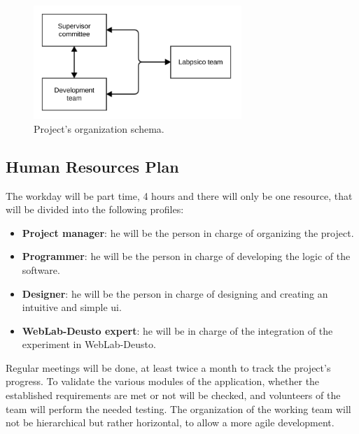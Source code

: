 \begin{figure}[ht]
	\centering
	\includegraphics[width=0.7\textwidth]{fig/organization}
	\caption{Project's organization schema.}\label{fig:org}
\end{figure}

\subsection{Human Resources Plan}

The workday will be part time, 4 hours and there will only be one resource, that will be divided
into the following profiles:

\begin{itemize}
\item \textbf{Project manager}: he will be the person in charge of organizing the project.

\item \textbf{Programmer}: he will be the person in charge of developing the logic of the
software.

\item \textbf{Designer}: he will be the person in charge of designing and creating an intuitive and
simple \acrlong{ui}.

\item \textbf{WebLab-Deusto expert}: he will be in charge of the integration of the experiment
in WebLab-Deusto.
\end{itemize}

Regular meetings will be done, at least twice a month to track the project's progress. To validate
the various modules of the application, whether the established requirements are met or not will be
checked, and volunteers of the team will perform the needed testing. The organization of the working team will
not be hierarchical but rather horizontal, to allow a more agile development.
